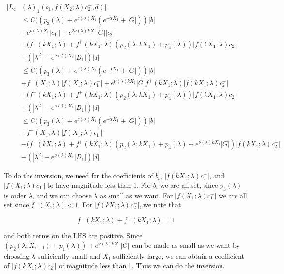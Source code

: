 \documentclass[12pt]{article}
\begin{document}
\begin{enumerate}
\begin{align*}
|L_4&(\lambda)_1(b_1, f(X_2; \lambda) c_2^-, d)|\\ 
&\leq C( ( p_3(\lambda) + e^{\nu(\lambda)X_1} (e^{-\alpha X_1} + |G|)) |b| \\
&+ e^{\nu(\lambda)X_1} |c_1^-| + e^{2 \nu(\lambda)k X_1}|G| |c_2^-| \\
&+ (f^-(k X_1; \lambda) + f^+(k X_1; \lambda) (p_2(\lambda; k X_1) + p_4(\lambda)) | f(k X_1; \lambda) c_2^-| \\
&+ (|\lambda^2| + e^{\nu(\lambda)X_1}|D_1|)|d| \\
&\leq C( ( p_3(\lambda) + e^{\nu(\lambda)X_1} (e^{-\alpha X_1} + |G|)) |b| \\
&+ f^-( X_1; \lambda) |f(X_1; \lambda) c_1^-| + e^{\nu(\lambda)k X_1}|G| f^+( k X_1; \lambda)| f(k X_1; \lambda) c_2^-| \\
&+ (f^-(k X_1; \lambda) + f^+(k X_1; \lambda) (p_2(\lambda; k X_1) + p_4(\lambda)) | f(k X_1; \lambda) c_2^-| \\
&+ (|\lambda^2| + e^{\nu(\lambda)X_1}|D_1|)|d| \\
&\leq C( ( p_3(\lambda) + e^{\nu(\lambda)X_1} (e^{-\alpha X_1} + |G|)) |b| \\
&+ f^-( X_1; \lambda) |f(X_1; \lambda) c_1^-| \\
&+ (f^-(k X_1; \lambda) + f^+(k X_1; \lambda) (p_2(\lambda; k X_1) + p_4(\lambda) + e^{\nu(\lambda)k X_1}|G| ) | f(k X_1; \lambda) c_2^-| \\
&+ (|\lambda^2| + e^{\nu(\lambda)X_1}|D_1|)|d|
\end{align*}


To do the inversion, we need for the coefficients of $b_i$, $| f(k X_1; \lambda) c_2^-| $, and $| f(X_1; \lambda) c_1^-|$ to have magnitude less than 1. For $b_i$ we are all set, since $p_3(\lambda)$ is order $\lambda$, and we can choose $\lambda$ as small as we want. For $|f(X_1; \lambda) c_1^-|$ we are all set since $f^-(X_1; \lambda) < 1$. For $|f(k X_1; \lambda) c_2^-|$, we note that 

\[
f^-(k X_1; \lambda) + f^+(k X_1; \lambda) = 1
\]

and both terms on the LHS are positive. Since $(p_2(\lambda; X_{i-1}) + p_4(\lambda)) + e^{\nu(\lambda)k X_1}|G| $ can be made as small as we want by choosing $\lambda$ sufficiently small and $X_1$ sufficiently large, we can obtain a coefficient of $| f(k X_1; \lambda) c_2^-|$ of magnitude less than 1. Thus we can do the inversion.\\


\end{enumerate}
\end{document}
